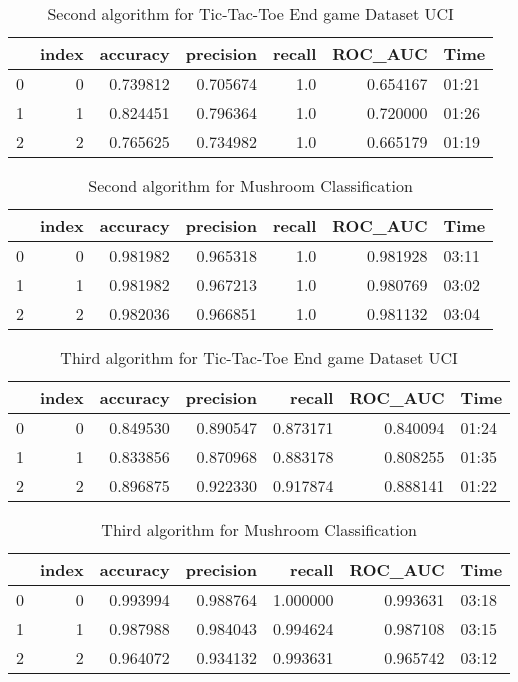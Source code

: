 \documentclass[12t]{article}
\begin{document}
\begin{table}[H]
\begin{tabular}{lrrrrrl}
	\toprule
	{} &  index &  accuracy &  precision &  recall &   ROC\_AUC &   Time \\
	\midrule
	0 &      0 &  0.739812 &   0.705674 &     1.0 &  0.654167 &  01:21 \\
	1 &      1 &  0.824451 &   0.796364 &     1.0 &  0.720000 &  01:26 \\
	2 &      2 &  0.765625 &   0.734982 &     1.0 &  0.665179 &  01:19 \\
	\bottomrule
\end{tabular}
	\caption{Second algorithm for Tic-Tac-Toe End game Dataset UCI  \label{tab:tab3}}
\end{table}

\begin{table}[H]
\begin{tabular}{lrrrrrl}
	\toprule
	{} &  index &  accuracy &  precision &  recall &   ROC\_AUC &   Time \\
	\midrule
	0 &      0 &  0.981982 &   0.965318 &     1.0 &  0.981928 &  03:11 \\
	1 &      1 &  0.981982 &   0.967213 &     1.0 &  0.980769 &  03:02 \\
	2 &      2 &  0.982036 &   0.966851 &     1.0 &  0.981132 &  03:04 \\
	\bottomrule
\end{tabular}
	\caption{Second algorithm for Mushroom Classification	  \label{tab:tab4}}
\end{table}

\begin{table}[H]
\begin{tabular}{lrrrrrl}
	\toprule
	{} &  index &  accuracy &  precision &    recall &   ROC\_AUC &   Time \\
	\midrule
	0 &      0 &  0.849530 &   0.890547 &  0.873171 &  0.840094 &  01:24 \\
	1 &      1 &  0.833856 &   0.870968 &  0.883178 &  0.808255 &  01:35 \\
	2 &      2 &  0.896875 &   0.922330 &  0.917874 &  0.888141 &  01:22 \\
	\bottomrule
\end{tabular}
	\caption{Third algorithm for Tic-Tac-Toe End game Dataset UCI  \label{tab:tab5}}
\end{table}


\begin{table}[H]
\begin{tabular}{lrrrrrl}
	\toprule
	{} &  index &  accuracy &  precision &    recall &   ROC\_AUC &   Time \\
	\midrule
	0 &      0 &  0.993994 &   0.988764 &  1.000000 &  0.993631 &  03:18 \\
	1 &      1 &  0.987988 &   0.984043 &  0.994624 &  0.987108 &  03:15 \\
	2 &      2 &  0.964072 &   0.934132 &  0.993631 &  0.965742 &  03:12 \\
	\bottomrule
\end{tabular}
	\caption{Third algorithm for Mushroom Classification	  \label{tab:tab6}}
\end{table}
\end{document}
